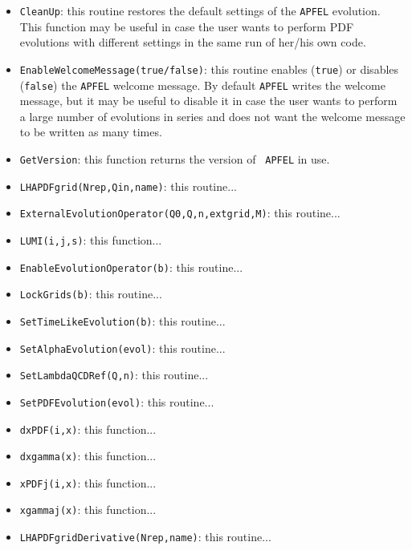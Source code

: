 \documentclass[11pt,a4paper]{article}
\begin{document}
\begin{itemize}
\item{\tt CleanUp}: this routine restores the default settings of the
  {\tt APFEL} evolution. This function may be useful in case the user
  wants to perform PDF evolutions with different settings in the same run
  of her/his own code.

\item{\tt EnableWelcomeMessage(true/false)}: this routine enables
  ({\tt true}) or disables ({\tt false}) the {\tt APFEL} welcome
  message. By default {\tt APFEL} writes the welcome message, but it
  may be useful to disable it in case the user wants to perform a
  large number of evolutions in series and does not want the welcome
  message to be written as many times.

\item{\tt GetVersion}: this function returns the version of {\tt
    APFEL} in use.

\item{\tt LHAPDFgrid(Nrep,Qin,name)}: this routine...

\item{\tt ExternalEvolutionOperator(Q0,Q,n,extgrid,M)}: this routine...

\item{\tt LUMI(i,j,s)}: this function...

\item{\tt EnableEvolutionOperator(b)}: this routine...

\item{\tt LockGrids(b)}: this routine...

\item{\tt SetTimeLikeEvolution(b)}: this routine...

\item{\tt SetAlphaEvolution(evol)}: this routine...

\item{\tt SetLambdaQCDRef(Q,n)}: this routine...

\item{\tt SetPDFEvolution(evol)}: this routine...

\item{\tt dxPDF(i,x)}: this function...

\item{\tt dxgamma(x)}: this function...

\item{\tt xPDFj(i,x)}: this function...

\item{\tt xgammaj(x)}: this function...

\item{\tt LHAPDFgridDerivative(Nrep,name)}: this routine...

\end{itemize}
\end{document}
